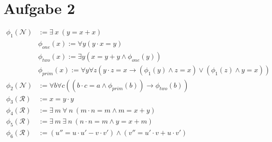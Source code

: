 \documentclass[a4paper,10pt]{article}
\begin{document}
\section*{Aufgabe 2}
\begin{align*}
\phi_1(\mathcal{N}) &:= \exists~ x~ (y = x + x) \\
 &\phi_{one}(x) := \forall y(y \cdot x = y) \\
 &\phi_{two}(x) := \exists y(x = y +y \land \phi_{one}(y)) \\
 &\phi_{prim}(x) := \forall y \forall z (y \cdot z = x \rightarrow (\phi_1(y) \land z = x) \lor (\phi_1(z) \land y = x)) \\
\phi_2(\mathcal{N}) &:= \forall b \forall c ((b \cdot c = a \land \phi_{prim}(b))\rightarrow \phi_{two}(b) ) \\
\phi_3(\mathcal{R}) &:= x = y \cdot y \\
\phi_4(\mathcal{R}) &:= \exists~ m~ \forall~ n~ (m \cdot n = m \wedge m = x + y) \\
\phi_5(\mathcal{R}) &:= \exists~ m~ \exists~ n~ (n \cdot n = m \wedge y = x + m) \\
\phi_6(\mathcal{R}) &:= (u'' = u \cdot u' - v \cdot v') \wedge (v'' = u' \cdot v + u \cdot v') \\
\end{align*}
\end{document}
